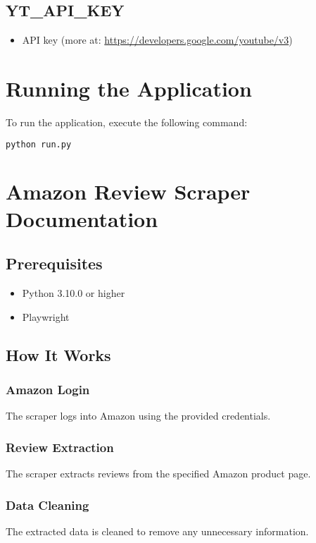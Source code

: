 \documentclass[a4paper]{article}
\begin{document}
\subsection{YT\_API\_KEY}
\begin{itemize}
    \item API key (more at: \url{https://developers.google.com/youtube/v3})
\end{itemize}

\section{Running the Application}
To run the application, execute the following command:
\begin{lstlisting}[language=bash]
python run.py
\end{lstlisting}

\section{Amazon Review Scraper Documentation}
\subsection{Prerequisites}
\begin{itemize}
    \item Python 3.10.0 or higher
    \item Playwright
\end{itemize}

\subsection{How It Works}
\subsubsection{Amazon Login}
The scraper logs into Amazon using the provided credentials.

\subsubsection{Review Extraction}
The scraper extracts reviews from the specified Amazon product page.

\subsubsection{Data Cleaning}
The extracted data is cleaned to remove any unnecessary information.
\end{document}
